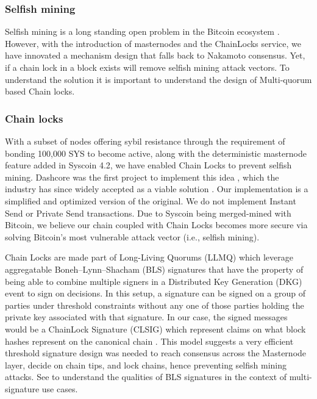 \documentclass[peerreview]{ieeesyscoin}
\begin{document}
\subsubsection{Selfish mining}

Selfish mining is a long standing open problem in the Bitcoin ecosystem \cite{Eya18}. However, with the introduction of masternodes and the ChainLocks service, we have innovated a mechanism design that falls back to Nakamoto consensus. Yet, if a chain lock in a block exists will remove selfish mining attack vectors. To understand the solution it is important to understand the design of Multi-quorum based Chain locks.

\subsubsection{Chain locks}

With a subset of nodes offering sybil resistance through the requirement of bonding 100,000 SYS to become active, along with the deterministic masternode feature added in Syscoin 4.2, we have enabled Chain Locks to prevent selfish mining. Dashcore was the first project to implement this idea \cite{Blo18}, which the industry has since widely accepted as a viable solution \cite{Val19}. Our implementation is a simplified and optimized version of the original. We do not implement Instant Send or Private Send transactions. Due to Syscoin being merged-mined with Bitcoin, we believe our chain coupled with Chain Locks becomes more secure via solving Bitcoin’s most vulnerable attack vector (i.e., selfish mining). 

Chain Locks are made part of Long-Living Quorums (LLMQ) which leverage aggregatable Boneh–Lynn–Shacham (BLS) signatures that have the property of being able to combine multiple signers in a Distributed Key Generation (DKG) event to sign on decisions. In this setup, a signature can be signed on a group of parties under threshold constraints without any one of those parties holding the private key associated with that signature. In our case, the signed messages would be a ChainLock Signature (CLSIG) which represent claims on what block hashes represent on the canonical chain \cite{Blo18}. This model suggests a very efficient   threshold signature design was needed to reach consensus across the Masternode layer, decide on chain tips, and lock chains, hence preventing selfish mining attacks. See \cite{Bon18} to understand the qualities of BLS signatures in the context of multi-signature use cases.
\end{document}
